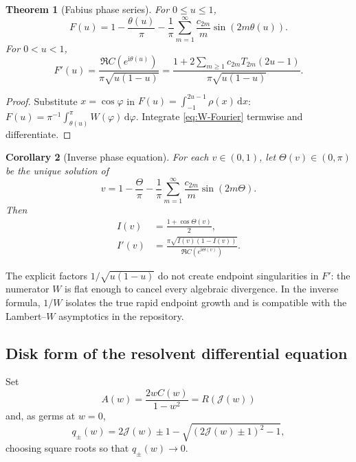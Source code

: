 \documentclass[11pt,oneside]{article}
\newtheorem{theorem}{Theorem}[section]
\newtheorem{corollary}[theorem]{Corollary}
\theoremstyle{definition}
\newcommand{\dd}{\,\mathrm d}
\newcommand{\ii}{\mathrm i}
\newcommand{\Jouk}{\mathcal J}
\begin{document}
\begin{theorem}[Fabius phase series]
\label{thm:F-phase}
For \(0\le u\le1\),
\begin{equation}
 \boxed{\displaystyle
 F(u)=1-\frac{\theta(u)}{\pi}
 -\frac1\pi\sum_{m=1}^{\infty}\frac{c_{2m}}{m}\sin(2m\theta(u)).}
 \label{eq:F-phase}
\end{equation}
For \(0<u<1\),
\begin{equation}
 F'(u)=\frac{\Re C(e^{\ii\theta(u)})}{\pi\sqrt{u(1-u)}}
 =\frac{1+2\sum_{m\ge1}c_{2m}T_{2m}(2u-1)}{\pi\sqrt{u(1-u)}}.
 \label{eq:Fprime-C}
\end{equation}
\end{theorem}

\begin{proof}
Substitute \(x=\cos\varphi\) in \(F(u)=\int_{-1}^{2u-1}\rho(x)\dd x\):
\(F(u)=\pi^{-1}\int_{\theta(u)}^\pi W(\varphi)\dd\varphi\). Integrate
\eqref{eq:W-Fourier} termwise and differentiate.
\end{proof}

\begin{corollary}[Inverse phase equation]
\label{cor:inverse-phase}
For each \(v\in(0,1)\), let \(\Theta(v)\in(0,\pi)\) be the unique solution of
\begin{equation}
 v=1-\frac{\Theta}{\pi}
 -\frac1\pi\sum_{m=1}^{\infty}\frac{c_{2m}}{m}\sin(2m\Theta).
 \label{eq:Theta-implicit}
\end{equation}
Then
\begin{align}
 I(v)&=\frac{1+\cos\Theta(v)}{2},
 \label{eq:I-phase}\\
 I'(v)&=\frac{\pi\sqrt{I(v)(1-I(v))}}{\Re C(e^{\ii\Theta(v)})}.
 \label{eq:Iprime-C}
\end{align}
\end{corollary}

The explicit factors \(1/\sqrt{u(1-u)}\) do not create endpoint singularities in \(F'\): the
numerator \(W\) is flat enough to cancel every algebraic divergence. In the inverse formula,
\(1/W\) isolates the true rapid endpoint growth and is compatible with the Lambert--\(W\)
asymptotics in the repository.

\subsection{Disk form of the resolvent differential equation}

Set
\begin{equation}
 A(w)=\frac{2wC(w)}{1-w^2}=R(\Jouk(w))
 \label{eq:A-disk}
\end{equation}
and, as germs at \(w=0\),
\begin{equation}
 q_{\pm}(w)=2\Jouk(w)\pm1-
 \sqrt{(2\Jouk(w)\pm1)^2-1},
 \label{eq:qpm}
\end{equation}
choosing square roots so that \(q_\pm(w)\to0\).
\end{document}
